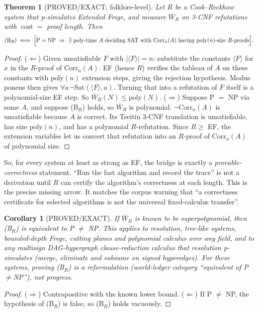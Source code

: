 \documentclass[11pt]{article}
\newtheorem{theorem}{Theorem}\newtheorem{corollary}{Corollary}\newtheorem{definition}{Definition}
\begin{document}
\begin{theorem}[PROVED/EXACT; folklore-level]
Let $R$ be a Cook--Reckhow system that p-simulates Extended Frege, and measure $\overline W_R$
on 3-CNF refutations with $\operatorname{cost}=$ proof length. Then
\[
(\mathrm B_R)\iff\Bigl[\mathrm P=\mathrm{NP}\ \Rightarrow\ \exists\text{ poly-time }A\text{ deciding SAT with }
\mathrm{Corr}_n(A)\text{ having }\mathrm{poly}(n)\text{-size }R\text{-proofs}\Bigr].
\]
\end{theorem}
\begin{proof}
($\Leftarrow$) Given unsatisfiable $F$ with $|\langle F\rangle|=n$: substitute the constants $\langle F\rangle$ for $x$ in the
$R$-proof of $\mathrm{Corr}_n(A)$. EF (hence $R$) verifies the tableau of $A$ on these constants with
$\mathrm{poly}(n)$ extension steps, giving the rejection hypothesis. Modus ponens then gives
$\forall a\,\neg\mathrm{Sat}(\langle F\rangle,a)$. Turning that into a refutation of $F$ itself is a
polynomial-size EF step. So $\overline W_R(N)\le\mathrm{poly}(N)$.
($\Rightarrow$) Suppose P $=$ NP via some $A$, and suppose (B$_R$) holds, so $\overline W_R$ is polynomial. $\neg\mathrm{Corr}_n(A)$ is unsatisfiable
because $A$ is correct. Its Tseitin 3-CNF translation is unsatisfiable, has size $\mathrm{poly}(n)$, and has a polynomial
$R$-refutation. Since $R\ge$ EF, the extension variables let us convert that refutation into an $R$-proof of
$\mathrm{Corr}_n(A)$ of polynomial size.
\end{proof}

\noindent So, for every system at least as strong as EF, the bridge is exactly a
\emph{provable-correctness} statement. ``Run the fast algorithm and record the trace'' is not a
derivation until $R$ can certify the algorithm's correctness at each length. This is the precise
missing arrow. It matches the corpus warning that ``a correctness certificate for selected
algorithms is not the universal fixed-calculus transfer''.

\begin{corollary}[PROVED/EXACT]
If $\overline W_R$ is known to be superpolynomial, then (B$_R$) is equivalent to P $\ne$ NP.
This applies to resolution, tree-like systems, bounded-depth Frege, cutting planes and
polynomial calculus over any field, and to any multisign DAG-hypergraph clause-reduction
calculus that resolution p-simulates (merge, eliminate and subsume on signed hyperedges).
For these systems, proving (B$_R$) is a \emph{reformulation} (world-ledger category
``equivalent of P$\ne$NP''), not progress.
\end{corollary}
\begin{proof}
($\Rightarrow$) Contrapositive with the known lower bound. ($\Leftarrow$) If P $\ne$ NP, the
hypothesis of (B$_R$) is false, so (B$_R$) holds vacuously.
\end{proof}
\end{document}
